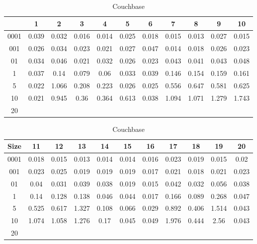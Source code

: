 \begin{center}
\begin{table} [ht]
\tiny
\caption{Couchbase}
\label{couchbase-query-result-table}
\begin{tabular}{|c|c|c|c|c|c|c|c|c|c|c| } 
    &  1 & 2 & 3 & 4 & 5 & 6 & 7 & 8 & 9 & 10 \\
 \hline
0001 & 0.039 & 0.032 & 0.016 & 0.014 & 0.025 & 0.018 & 0.015 & 0.013 & 0.027 & 0.015	\\
001 & 0.026 & 0.034 & 0.023 & 0.021 & 0.027 & 0.047 & 0.014 & 0.018 & 0.026 & 0.023	\\
01 & 0.034 & 0.046 & 0.021 & 0.032 & 0.026 & 0.023 & 0.043 & 0.041 & 0.043 & 0.048	\\
1 & 0.037 & 0.14 & 0.079 & 0.06 & 0.033 & 0.039 & 0.146 & 0.154 & 0.159 & 0.161	\\
5 & 0.022 & 1.066 & 0.208 & 0.223 & 0.026 & 0.025 & 0.556 & 0.647 & 0.581 & 0.625	\\
10 & 0.021 & 0.945 & 0.36 & 0.364 & 0.613 & 0.038 & 1.094 & 1.071 & 1.279 & 1.743	\\
20 &  &  &  &  &  &  &  &  &  & 	\\

\end{tabular}
\begin{tabular}{|c|c|c|c|c|c|c|c|c|c|c| } 
Size & 11 & 12 & 13 & 14 & 15 & 16 & 17 & 18 & 19 & 20	\\
\hline
0001 & 0.018 & 0.015 & 0.013 & 0.014 & 0.014 & 0.016 & 0.023 & 0.019 & 0.015 & 0.02	\\
001 & 0.023 & 0.025 & 0.019 & 0.019 & 0.019 & 0.017 & 0.021 & 0.018 & 0.021 & 0.023	\\
01 & 0.04 & 0.031 & 0.039 & 0.038 & 0.019 & 0.015 & 0.042 & 0.032 & 0.056 & 0.038	\\
1 & 0.14 & 0.128 & 0.138 & 0.046 & 0.044 & 0.017 & 0.166 & 0.089 & 0.268 & 0.047	\\
5 & 0.525 & 0.617 & 1.327 & 0.108 & 0.066 & 0.029 & 0.892 & 0.406 & 1.514 & 0.043	\\
10 & 1.074 & 1.058 & 1.276 & 0.17 & 0.045 & 0.049 & 1.976 & 0.444 & 2.56 & 0.043	\\
20 &  &  &  &  &  &  &  &  &  & 	\\


\end{tabular}
\end{table}

\end{center}

